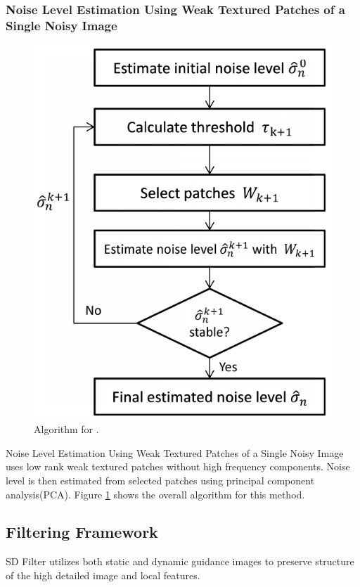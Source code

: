 \documentclass[10pt,twocolumn,letterpaper]{article}
\begin{document}
\subsubsection{Noise Level Estimation Using Weak Textured Patches of a Single Noisy Image} \label{ss:weak-tex}
\begin{figure}
	\includegraphics[width=0.9\columnwidth]{single_image_noise_estimation.png}
	\caption{Algorithm for \cite{noise-weak-texture}.}
	\label{fig:alg-weak-texture}
\end{figure}
Noise Level Estimation Using Weak Textured Patches of a Single Noisy Image\cite{noise-weak-texture} uses low rank weak textured patches without high frequency components. Noise level is then estimated from selected patches using principal component analysis(PCA). Figure \ref{fig:alg-weak-texture} shows the overall algorithm for this method.

\subsection{Filtering Framework}
SD Filter\cite{ham2015} utilizes both static and dynamic guidance images to preserve structure of the high detailed image and local features.
\end{document}
